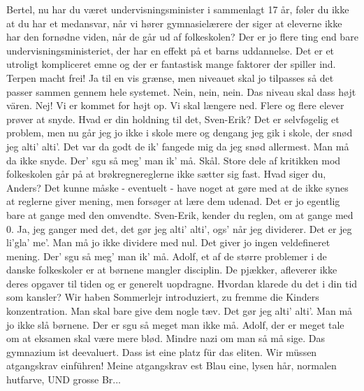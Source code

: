 \documentclass[a4paper,11pt]{article}
\begin{document}
\begin{sketch}
Bertel, nu har du været undervisningsminister i sammenlagt 17 år, føler du ikke at du har et medansvar, når vi hører gymnasielærere der siger at eleverne ikke har den fornødne viden, når de går ud af folkeskolen?
 Der er jo flere ting end bare undervisningsministeriet, der har en effekt på et barns uddannelse. Det er et utroligt kompliceret emne og der er fantastisk mange faktorer der spiller ind.
 Terpen macht frei!
 Ja til en vis grænse, men niveauet skal jo tilpasses så det passer sammen gennem hele systemet.
 Nein, nein, nein. Das niveau skal dass højt vären. 
 Nej! Vi er kommet for højt op. Vi skal længere ned. 
 Flere og flere elever prøver at snyde. Hvad er din holdning til det, Sven-Erik?
 Det er selvføgelig et problem, men nu går jeg jo ikke i skole mere og dengang jeg gik i skole, der snød jeg alti' alti'. Det var da godt de ik' fangede mig da jeg snød allermest.
 Man må da ikke snyde.
 Der' sgu så meg' man ik' må. Skål.
 Store dele af kritikken mod folkeskolen går på at brøkregnereglerne ikke sætter sig fast. Hvad siger du, Anders?
 Det kunne måske - eventuelt - have noget at gøre med at de ikke synes at reglerne giver mening, men forsøger at lære dem udenad. Det er jo egentlig bare at gange med den omvendte.
 Sven-Erik, kender du reglen, om at gange med 0.
 Ja, jeg ganger med det, det gør jeg alti' alti', ogs' når jeg dividerer. Det er jeg li'gla' me'.
 Man må jo ikke dividere med nul. Det giver jo ingen veldefineret mening.
 Der' sgu så meg' man ik' må.
 Adolf, et af de større problemer i de danske folkeskoler er at børnene mangler disciplin. De pjækker, afleverer ikke deres opgaver til tiden og er generelt uopdragne. Hvordan klarede du det i din tid som kansler?
 Wir haben Sommerlejr introduziert, zu fremme die Kinders konzentration.
 Man skal bare give dem nogle tæv. Det gør jeg alti' alti'.
 Man må jo ikke slå børnene.
 Der er sgu så meget man ikke må.
 Adolf, der er meget tale om at eksamen skal være mere blød. Mindre nazi om man så må sige.
 Das gymnazium ist deevaluert. Dass ist eine platz für das eliten. Wir müssen atgangskrav einführen! Meine atgangskrav est Blau eine, lysen hår, normalen hutfarve, UND grosse Br...

\end{sketch}
\end{document}
